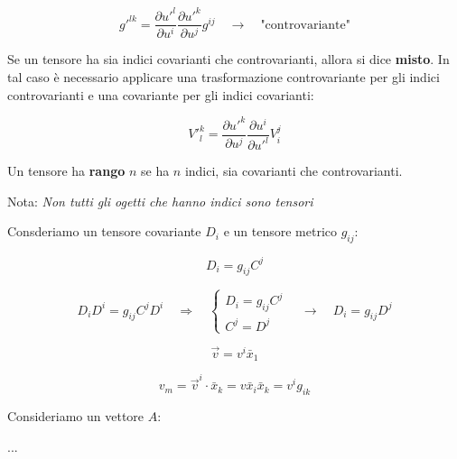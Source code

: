 $$
g'^{lk} = \dfrac {\partial u'^l}{\partial u^i} \dfrac {\partial u'^k}{\partial u^j} g^{ij} \quad \rightarrow \quad \text{"controvariante"}
$$

Se un tensore ha sia indici covarianti che controvarianti, allora si dice \textbf{misto}. In tal caso è necessario applicare una trasformazione controvariante per gli indici controvarianti e una covariante per gli indici covarianti:

$$
V'^k_l = \dfrac {\partial u'^k}{\partial u^j} \dfrac {\partial u^i}{\partial u'^l} V^j_i
$$

\begin{observationblock}
    Un tensore ha \textbf{rango} $n$ se ha $n$ indici, sia covarianti che controvarianti.

    Nota: \textit{Non tutti gli ogetti che hanno indici sono tensori}
\end{observationblock}

\newpage

Consderiamo un tensore covariante $D_i$ e un tensore metrico $g_{ij}$:

$$
D_i = g_{ij} C^j
$$


$$
D_i D^i = g_{ij} C^j D^i \quad \Rightarrow \quad 
\begin{cases}
    D_i = g_{ij} C^j\\
    C^j = D^j
\end{cases}
\quad \rightarrow \quad 
D_i = g_{ij} D^j
$$

\vspace{5em}

$$
\vec v = v^i \bar x_1
$$

$$
v_m = \vec v^i \cdot \bar x_k = v \bar x_i \bar x_k = v^i g_{ik}
$$

Consideriamo un vettore $A$:

...
